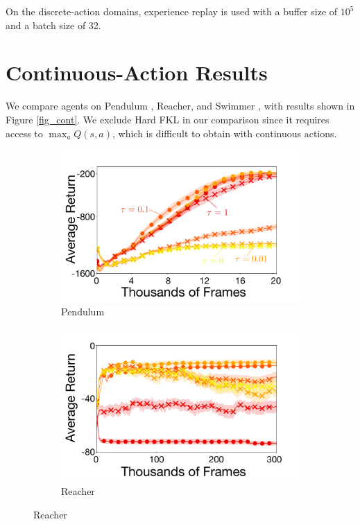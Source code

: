 \documentclass[\main/thesis.tex]{subfiles}
\begin{document}
On the discrete-action domains, experience replay is used with a buffer size of $10^5$ and a batch size of 32. 

\section{Continuous-Action Results}
We compare agents on Pendulum \citep{brockman2016openai}, Reacher, and Swimmer \citep{todorov2012mujoco}, with results shown in Figure \ref{fig_cont}. We exclude Hard FKL in our comparison since it requires access to $\max_a Q(s,a)$, which is difficult to obtain with continuous actions. 


\begin{figure}[t]
  \centering
  \begin{subfigure}[b]{0.5\linewidth}
    \centering
    \includegraphics[width=\columnwidth]{figs/deep/continuous/PD_entropy_comparison.pdf} 
    \caption{Pendulum}\label{fig:pendulum}
  \end{subfigure}%
  \begin{subfigure}[b]{0.5\linewidth}
    \centering
    \includegraphics[width=\columnwidth]{figs/deep/continuous/Reacher_entropy_comparison.pdf} 
    \caption{Reacher}\label{fig:reacher}
  \end{subfigure}
  

\end{figure}
\end{document}
